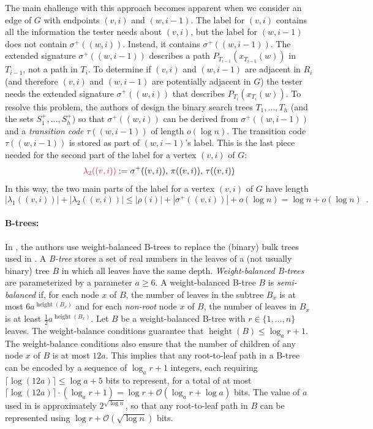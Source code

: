 \documentclass{patmorin}
\makeatletter
\renewcommand{\ge}{\geqslant}
\renewcommand{\le}{\leqslant}
\DeclareMathOperator{\height}{height}
\newcommand{\defin}[1]{\emph{\textcolor{brightmaroon}{#1}}}
\def\mathcolor#1#{\@mathcolor{#1}}
\def\@mathcolor#1#2#3{%
  \protect\leavevmode
  \begingroup
    \color#1{#2}#3%
  \endgroup
}
\newcommand{\mathdefin}[1]{\mathcolor{brightmaroon}{#1}}
\newcommand{\Oh}{\calO}
\newcommand{\calO}{\mathcal{O}}
\makeatother
\begin{document}
  The main challenge with this approach becomes apparent when we consider an edge of $G$ with endpoints $(v,i)$ and $(w,i-1)$.
  The label for $(v,i)$ contains all the information the tester needs about $(v,i)$, but the label for $(w,i-1)$ does not contain $\sigma^+((w,i))$.
  Instead, it contains $\sigma^+((w,i-1))$.  The extended signature $\sigma^+((w,i-1))$ describes a path $P_{T_{i-1}}(x_{T_{i-1}}(w))$ in $T_{i-1}$, not a path in $T_i$.  To determine if $(v,i)$ and $(w,i-1)$ are adjacent in $R_i$ (and therefore $(v,i)$ and $(w,i-1)$ are potentially adjacent in $G$) the tester needs the extended signature $\sigma^+((w,i))$ that describes $P_{T_i}(x_{T_i}(w))$.  To resolve this problem, the authors of \cite{dujmovic.esperet.ea:adjacency} design the binary search trees $T_1,\ldots,T_h$ (and the sets $S^+_1,\ldots,S^+_h$) so that $\sigma^+((w,i))$ can be derived from $\sigma^+((w,i-1))$ and a \defin{transition code} \defin{$\tau((w,i-1))$} of length $o(\log n)$. The transition code $\tau((w,i-1))$ is stored as part of $(w,i-1)$'s label.
  This is the last piece needed for the second part of the label for a vertex $(v,i)$ of $G$:
  \[
    \mathdefin{\lambda_2((v,i))} := \sigma^+((v,i)),\, \pi((v,i)),\, \tau((v,i))
  \]
  In this way, the two main parts of the label for a vertex $(v,i)$ of $G$ have length
  \[
      |\lambda_1((v,i))|+|\lambda_2((v,i))| \le |\rho(i)| + |\sigma^+((v,i))| + o(\log n) = \log n + o(\log n) \enspace .
  \]

  \paragraph{B-trees:}
  In \cite{gawrychowski.janczewski:simpler}, the authors use weight-balanced B-trees to replace the (binary) bulk trees used in \cite{dujmovic.esperet.ea:adjacency}.
  A \defin{B-tree} stores a set of real numbers in the leaves of a (not usually binary) tree $B$ in which all leaves have the same depth.
  \defin{Weight-balanced B-trees} are parameterized by a parameter $a\ge 6$.  A weight-balanced B-tree $B$ is \defin{semi-balanced} if, for each node $x$ of $B$, the number of leaves in the subtree $B_x$ is at most $6a^{\height(B_x)}$ and for each \emph{non-root} node $x$ of $B$, the number of leaves in $B_x$ is at least $\tfrac{1}{2}a^{\height(B_x)}$.
  Let $B$ be a weight-balanced B-tree with $r\in \{1,\ldots,n\}$ leaves.  The weight-balance conditions guarantee that $\height(B)\le \log_a r + 1$.
  The weight-balance conditions also ensure that the number of children of any node $x$ of $B$ is at most $12a$.
  This implies that any root-to-leaf path in a B-tree can be encoded by a sequence of $\log_a r+1$ integers, each requiring $\lceil\log(12a)\rceil\le \log a + 5$ bits to represent, for a total of at most $\lceil\log(12a)\rceil\cdot(\log_a r+1)=\log r + \Oh(\log_a r + \log a)$ bits.
  The value of $a$ used in \cite{gawrychowski.janczewski:simpler} is approximately $2^{\sqrt{\log n}}$, so that any root-to-leaf path in $B$ can be represented using $\log r + \Oh(\sqrt{\log n})$ bits.
\end{document}
